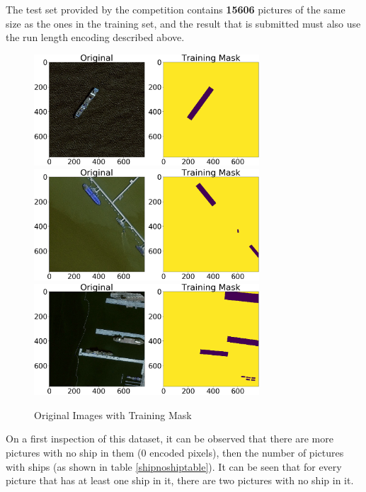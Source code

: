 The test set provided by the competition contains \textbf{15606} pictures of the same size as the ones in the training set, and the result that is submitted must also use the run length encoding described above.
\begin{figure}
	\centering
	\includegraphics[width=0.75\textwidth]{Pictures/015OrigMaskExample1.png} \\
	\includegraphics[width=0.75\textwidth]{Pictures/015OrigMaskExample2.png} \\
	\includegraphics[width=0.75\textwidth]{Pictures/015OrigMaskExample3.png} 
	\caption{Original Images with Training Mask}
	\label{OrigMask}
\end{figure}

On a first inspection of this dataset, it can be observed that there are more pictures with no ship in them (0 encoded pixels), then the number of pictures with ships (as shown in table \ref{shipnoshiptable}). It can be seen that for every picture that has at least one ship in it, there are two pictures with no ship in it.

